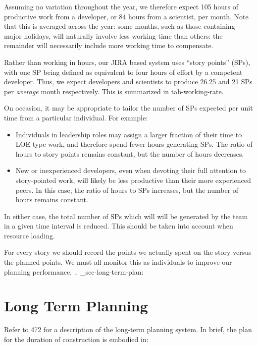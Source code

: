 Assuming no variation throughout the year, we therefore expect 105 hours
of productive work from a developer, or 84 hours from a scientist, per
month. Note that this is averaged across the year: some months, such as
those containing major holidays, will naturally involve less working
time than others: the remainder will necessarily include more working
time to compensate.

Rather than working in hours, our JIRA based system uses ``story
points'' (SPs), with one SP being defined as equivalent to four hours of
effort by a competent developer. Thus, we expect developers and
scientists to produce 26.25 and 21 SPs per \emph{average} month
respectively. This is summarized in tab-working-rate.

On occasion, it may be appropriate to tailor the number of SPs expected
per unit time from a particular individual. For example:

\begin{itemize}
\item
  Individuals in leadership roles may assign a larger fraction of their
  time to LOE type work, and therefore spend fewer hours generating SPs.
  The ratio of hours to story points remains constant, but the number of
  hours decreases.
\item
  New or inexperienced developers, even when devoting their full
  attention to story-pointed work, will likely be less productive than
  their more experienced peers. In this case, the ratio of hours to SPs
  increases, but the number of hours remains constant.
\end{itemize}

In either case, the total number of SPs which will will be generated by
the team in a given time interval is reduced. This should be taken into
account when resource loading.

For every story we should record the points we actually spent on the
story versus the planned points. We must all monitor this as individuals
to improve our planning performance. .. \_sec-long-term-plan:

\section{Long Term Planning}\label{long-term-planning}

Refer to 472 for a description of the long-term planning system. In
brief, the plan for the duration of construction is embodied in:

